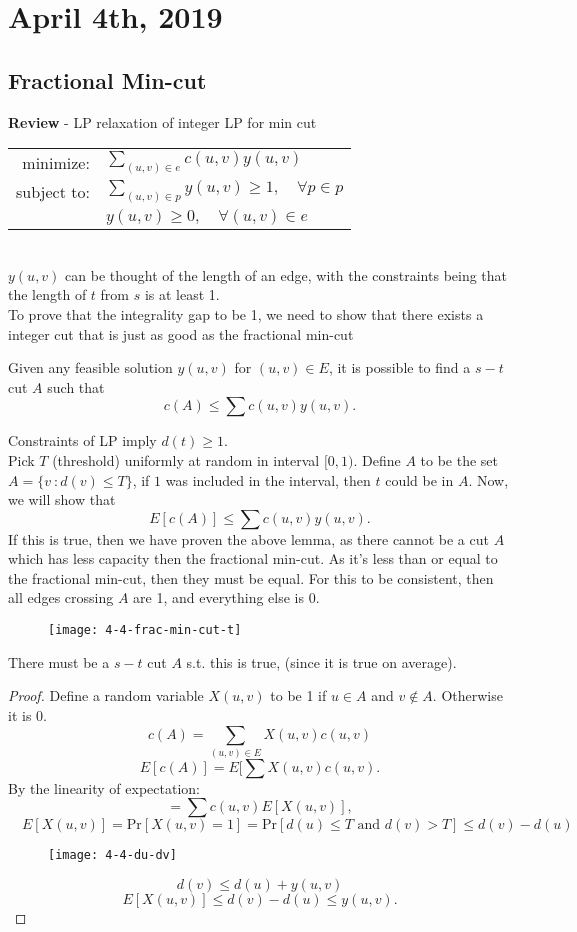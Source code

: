 \documentclass[../main/main.tex]{subfiles}
\begin{document}
\section{April  4th, 2019}
\subsection{Fractional Min-cut}
\textbf{Review} - LP relaxation of integer LP for min cut\\

\begin{tabular}{rl}
	minimize: &$\sum_{(u,v)\in e}c(u,v)y(u,v)$\\
	subject to: & $\sum_{(u,v)\in p}y(u,v) \ge 1,\quad\forall p\in p$\\
				&$y(u,v)\ge 0,\quad\forall (u,v)\in e$
\end{tabular}\\
$y(u,v)$ can be thought of the length of an edge, with the constraints being that the length of  $t$ from $s$ is at least 1.\\

To prove that the integrality gap to be 1, we need to show that there exists a integer cut that is just as good as the fractional min-cut

\begin{lemma}
	Given any feasible solution $y(u,v)$ for $(u,v)\in E$, it is possible to find a $s-t$ cut $A$ such that \[
		c(A) \le  \sum c(u,v)y(u,v)
	.\] 
\end{lemma}
Constraints of LP imply $d(t)\ge 1$. \\

Pick $T$ (threshold) uniformly at random in interval $[0,1)$. Define $A$ to be the set $A=\{v\ :d(v) \le T\}$, if $1$ was included in the interval, then $t$ could be in $A$. Now, we will show that \[
	E[c(A)]\le \sum c(u,v)y(u,v)
.\] If this is true, then we have proven the above lemma, as there cannot be a cut $A$ which has less capacity then the fractional min-cut. As it's less than or equal to the fractional min-cut, then they must be equal. For this to be consistent, then all edges crossing $A$ are 1, and everything else is $0$.\\
\begin{figure}[h!]
	\centering
	\texttt{[image: 4-4-frac-min-cut-t]}
	\label{fig:4-4-frac-min-cut-t}
\end{figure}
There must be a $s-t$ cut $A$ s.t. this is true, (since it is true on average).
\begin{proof}
	Define a random variable $X(u,v)$ to be 1 if $u\in A$ and $v\not\in A$. Otherwise it is $0$. \\
	\[
		c(A)=\sum_{(u,v)\in E} X(u,v)c(u,v)
	\] \[
	E[c(A)]=E[\sum X(u,v)c(u,v)
	.\] By the linearity of expectation:
	\[
		=\sum c(u,v)E[X(u,v)],\]
		\[ \quad E[X(u,v)] = \text{Pr}[X(u,v)=1]=\text{Pr}[d(u)\le T \text{ and }d(v)>T]\le d(v)-d(u)
	\] 
	\begin{figure}[h!]
		\centering
		\texttt{[image: 4-4-du-dv]}
		\label{fig:}
	\end{figure}\[
	d(v)\le d(u)+y(u,v)
	\]
	\[
		E[X(u,v)]\le d(v)-d(u)\le y(u,v)
	.\]  
\end{proof}
\end{document}
